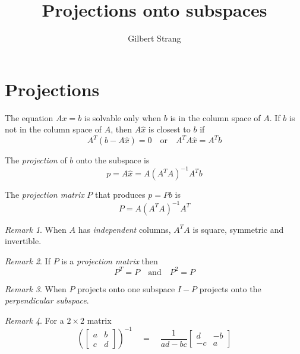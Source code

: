 \documentclass{tufte-handout}
\author{Gilbert Strang}
\title{Projections onto subspaces}
\theoremstyle{definition} \newtheorem{definition}{Definition}
\theoremstyle{remark} \newtheorem{remark}{Remark}
\begin{document}
\maketitle

\section{Projections}
The equation $Ax = b$ is solvable only when $b$ is in the column space
of $A$. If $b$ is not in the column space of $A$, then $A\hat{x}$ is
closest to $b$ if
\begin{equation*}
  A^T(b - A\hat{x}) = 0 \quad \text{or}  \quad A^TA\hat{x} = A^Tb
\end{equation*}

The \emph{projection} of $b$ onto the subspace is
\begin{equation*}
  p = A\hat{x} = A(A^TA)^{-1}A^Tb
\end{equation*}

The \emph{projection matrix} $P$ that produces $p = Pb$ is
\begin{equation*}
  P = A(A^TA)^{-1}A^T
\end{equation*}

\begin{remark}
  When $A$ has \emph{independent} columns, $A^TA$ is square, symmetric
  and invertible.
\end{remark}

\begin{remark}
  If $P$ is a \emph{projection matrix} then
  \begin{equation*}
    P^T = P \quad \text{and} \quad P^2 = P
  \end{equation*}
\end{remark}

\begin{remark}
  When $P$ projects onto one subspace $I - P$ projects onto the
  \emph{perpendicular subspace}.
\end{remark}

\begin{remark}
 For a $2 \times 2$ matrix
 \begin{equation*}
   \left(
     \begin{bmatrix}
       a & b \\
       c & d
     \end{bmatrix}
     \right)^{-1}
     \quad = \quad
     \frac{1}{ad - bc}
   \begin{bmatrix}
     d & -b \\
     -c & a
   \end{bmatrix}
 \end{equation*}
\end{remark}
\end{document}
